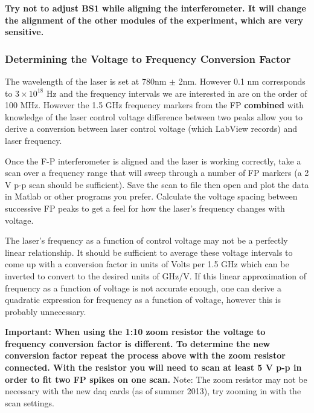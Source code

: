 \documentclass{../lab}
\begin{document}
\textbf{Try not to adjust BS1 while aligning the interferometer. It will change the alignment of the other modules of the experiment, which are very sensitive.}

\subsubsection{Determining the Voltage to Frequency Conversion Factor}

The wavelength of the laser is set at 780nm $\pm$ 2nm. However 0.1 nm corresponds to $3 \times 10^{18}$ Hz and the frequency intervals we are interested in are on the order of 100 MHz. However the 1.5 GHz frequency markers from the FP \textbf{combined} with knowledge of the laser control voltage difference between two peaks allow you to derive a conversion between laser control voltage (which LabView records) and laser frequency.

Once the F-P interferometer is aligned and the laser is working correctly, take a scan over a frequency range that will sweep through a number of FP markers (a 2 V p-p scan should be sufficient). Save the scan to file then open and plot the data in Matlab or other programs you prefer. Calculate the voltage spacing between successive FP peaks to get a feel for how the laser's frequency changes with voltage.

The laser's frequency as a function of control voltage may not be a perfectly linear relationship. It should be sufficient to average these voltage intervals to come up with a conversion factor in units of Volts per 1.5 GHz which can be inverted to convert to the desired units of GHz/V. If this linear approximation of frequency as a function of voltage is not accurate enough, one can derive a quadratic expression for frequency as a function of voltage, however this is probably unnecessary.



\textbf{Important: When using the 1:10 zoom resistor the voltage to frequency conversion factor is different. To determine the new conversion factor repeat the process above with the zoom resistor connected. With the resistor you will need to scan at least 5 V p-p in order to fit two FP spikes on one scan.} Note: The zoom resistor may not be necessary with the new daq cards (as of summer 2013), try zooming in with the scan settings.
\end{document}
